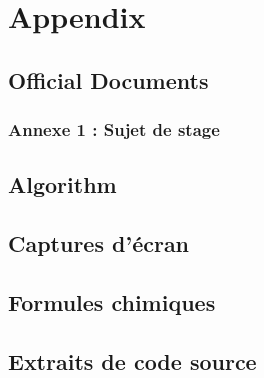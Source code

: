 \appendix
\chapter{Appendix}

\section{Official Documents}

\subsection{Annexe 1 : Sujet de stage}


\section{Algorithm}


\section{Captures d'écran}

\section{Formules chimiques}

\section{Extraits de code source}